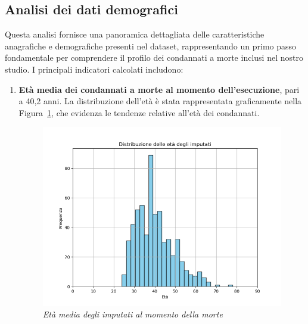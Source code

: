 \documentclass[11pt]{article}
\begin{document}
\subsection{Analisi dei dati demografici}
Questa analisi fornisce una panoramica dettagliata delle caratteristiche anagrafiche e demografiche presenti nel dataset, rappresentando un primo passo fondamentale per comprendere il profilo dei condannati a morte inclusi nel nostro studio. I principali indicatori calcolati includono:
\begin{enumerate}
    \item \textbf{Età media dei condannati a morte al momento dell'esecuzione}, pari a 40,2 anni. La distribuzione dell'età è stata rappresentata graficamente nella Figura~\ref{fig:età_media}, che evidenza le tendenze relative all'età dei condannati. 
        \begin{figure}
        \centering
        \includegraphics[width= 1 \linewidth]{grafico_eta_media.png}
        \caption{\textit{Età media degli imputati al momento della morte}}
        \label{fig:età_media}
    \end{figure}
  

\end{enumerate}
\end{document}
